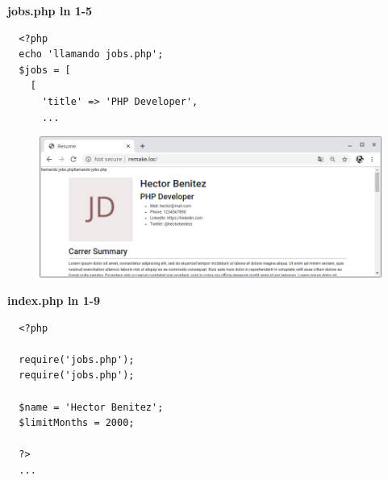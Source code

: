 \documentclass{article}
\begin{document}
\textbf{jobs.php ln 1-5}
\begin{verbatim}
  <?php
  echo 'llamando jobs.php';
  $jobs = [
    [
      'title' => 'PHP Developer',
      ...
\end{verbatim}

\begin{figure}[h!]
  \centering
  \includegraphics[scale=0.5]{./Pictures/040_require_doble.png}
\end{figure}

\textbf{index.php ln 1-9}
\begin{verbatim}
  <?php

  require('jobs.php');
  require('jobs.php');

  $name = 'Hector Benitez';
  $limitMonths = 2000;

  ?>
  ...
\end{verbatim}
\end{document}
